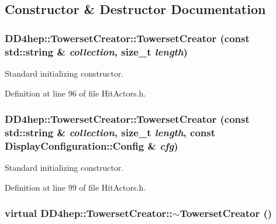 \subsection{Constructor \& Destructor Documentation}
\hypertarget{struct_d_d4hep_1_1_towerset_creator_ad29dbe8a2d87c04776af0852f614ee13}{
\subsubsection[{TowersetCreator}]{\setlength{\rightskip}{0pt plus 5cm}DD4hep::TowersetCreator::TowersetCreator (const std::string \& {\em collection}, \/  size\_\-t {\em length})}}
\label{struct_d_d4hep_1_1_towerset_creator_ad29dbe8a2d87c04776af0852f614ee13}


Standard initializing constructor. 

Definition at line 96 of file HitActors.h.\hypertarget{struct_d_d4hep_1_1_towerset_creator_a7e565ec3d9642bf0a3f778e730d1b9aa}{
\subsubsection[{TowersetCreator}]{\setlength{\rightskip}{0pt plus 5cm}DD4hep::TowersetCreator::TowersetCreator (const std::string \& {\em collection}, \/  size\_\-t {\em length}, \/  const {\bf DisplayConfiguration::Config} \& {\em cfg})}}
\label{struct_d_d4hep_1_1_towerset_creator_a7e565ec3d9642bf0a3f778e730d1b9aa}


Standard initializing constructor. 

Definition at line 99 of file HitActors.h.\hypertarget{struct_d_d4hep_1_1_towerset_creator_ae74914cad72d7fdd2b78f97cd74b7b90}{
\subsubsection[{$\sim$TowersetCreator}]{\setlength{\rightskip}{0pt plus 5cm}virtual DD4hep::TowersetCreator::$\sim$TowersetCreator ()}}
\label{struct_d_d4hep_1_1_towerset_creator_ae74914cad72d7fdd2b78f97cd74b7b90}


